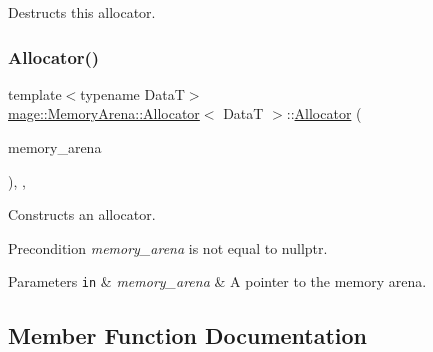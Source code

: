Destructs this allocator. \hypertarget{structmage_1_1_memory_arena_1_1_allocator_a10a6ea82aab121d4e04efa004a49910b}{}\label{structmage_1_1_memory_arena_1_1_allocator_a10a6ea82aab121d4e04efa004a49910b} 
\subsubsection{\texorpdfstring{Allocator()}{Allocator()}\hspace{0.1cm}{\footnotesize\ttfamily [4/4]}}
{\footnotesize\ttfamily template$<$typename DataT$>$ \\
\hyperlink{structmage_1_1_memory_arena_1_1_allocator}{mage\+::\+Memory\+Arena\+::\+Allocator}$<$ DataT $>$\+::\hyperlink{structmage_1_1_memory_arena_1_1_allocator}{Allocator} (\begin{DoxyParamCaption}\item[{\hyperlink{classmage_1_1_memory_arena}{Memory\+Arena} $\ast$}]{memory\+\_\+arena }\end{DoxyParamCaption})\hspace{0.3cm}{\ttfamily [explicit]}, {\ttfamily [private]}, {\ttfamily [noexcept]}}

Constructs an allocator.

\begin{DoxyPrecond}{Precondition}
{\itshape memory\+\_\+arena} is not equal to {\ttfamily nullptr}. 
\end{DoxyPrecond}

\begin{DoxyParams}[1]{Parameters}
\mbox{\tt in}  & {\em memory\+\_\+arena} & A pointer to the memory arena. \\
\hline
\end{DoxyParams}


\subsection{Member Function Documentation}
\hypertarget{structmage_1_1_memory_arena_1_1_allocator_a0c93aee3ba1247b1ad34b304f00418fd}{}\label{structmage_1_1_memory_arena_1_1_allocator_a0c93aee3ba1247b1ad34b304f00418fd} 
